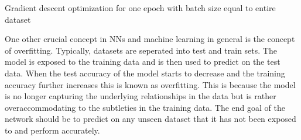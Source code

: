 \begin{algorithm}[!t] \AlgoFontSize \DontPrintSemicolon {} 
  \BlankLine


  \BlankLine


  \BlankLine

  \BlankLine


  \caption{Gradient descent optimization for one epoch with batch size equal to entire dataset}
  \label{review:algo:grad}
\end{algorithm}

One other crucial concept in \ac{NN}s and machine learning in general is the concept
of overfitting. Typically, datasets are seperated into test and train sets. The
model is exposed to the training data and is then used to predict on the test
data. When the test accuracy of the model starts to decrease and the training
accuracy further increases this is known as overfitting. This is because the
model is no longer capturing the underlying relationships in the data but is
rather overaccommodating to the subtleties in the training data. The end goal of
the network should be to predict on any unseen dataset that it has not been
exposed to and perform accurately.

